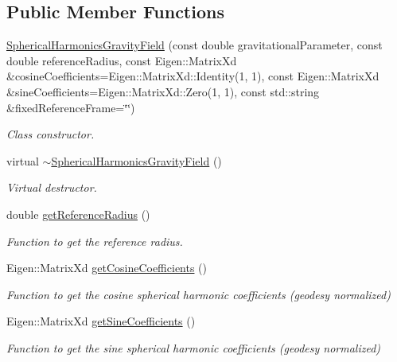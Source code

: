 \subsection*{Public Member Functions}
\begin{DoxyCompactItemize}
\item 
\hyperlink{classtudat_1_1gravitation_1_1SphericalHarmonicsGravityField_a0003100c4ca11159c95678177a4574d9}{Spherical\+Harmonics\+Gravity\+Field} (const double gravitational\+Parameter, const double reference\+Radius, const Eigen\+::\+Matrix\+Xd \&cosine\+Coefficients=Eigen\+::\+Matrix\+Xd\+::\+Identity(1, 1), const Eigen\+::\+Matrix\+Xd \&sine\+Coefficients=Eigen\+::\+Matrix\+Xd\+::\+Zero(1, 1), const std\+::string \&fixed\+Reference\+Frame=\char`\"{}\char`\"{})
\begin{DoxyCompactList}\small\item\em Class constructor. \end{DoxyCompactList}\item 
virtual \hyperlink{classtudat_1_1gravitation_1_1SphericalHarmonicsGravityField_a368ca429e816d6d62ddbe7696e228b79}{$\sim$\+Spherical\+Harmonics\+Gravity\+Field} ()
\begin{DoxyCompactList}\small\item\em Virtual destructor. \end{DoxyCompactList}\item 
double \hyperlink{classtudat_1_1gravitation_1_1SphericalHarmonicsGravityField_a39de2873ed5bb4b906e56ccc1351addb}{get\+Reference\+Radius} ()
\begin{DoxyCompactList}\small\item\em Function to get the reference radius. \end{DoxyCompactList}\item 
Eigen\+::\+Matrix\+Xd \hyperlink{classtudat_1_1gravitation_1_1SphericalHarmonicsGravityField_a3bf8d4b53afe4cd89c0daa01e21e031c}{get\+Cosine\+Coefficients} ()
\begin{DoxyCompactList}\small\item\em Function to get the cosine spherical harmonic coefficients (geodesy normalized) \end{DoxyCompactList}\item 
Eigen\+::\+Matrix\+Xd \hyperlink{classtudat_1_1gravitation_1_1SphericalHarmonicsGravityField_a3ae43643d8951471df022b0bab58d775}{get\+Sine\+Coefficients} ()
\begin{DoxyCompactList}\small\item\em Function to get the sine spherical harmonic coefficients (geodesy normalized) \end{DoxyCompactList}\item 

\end{DoxyCompactItemize}
